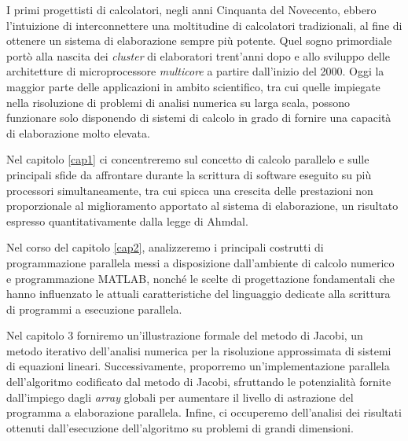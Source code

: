 I primi progettisti di calcolatori, negli anni Cinquanta del Novecento, ebbero l'intuizione di interconnettere
una moltitudine di calcolatori tradizionali, al fine di ottenere un sistema di elaborazione sempre più potente.\newline
Quel sogno primordiale port\`o alla nascita dei \textit{cluster} di elaboratori trent'anni dopo e allo sviluppo delle architetture di microprocessore
\textit{multicore} a partire dall'inizio del 2000.\newline
Oggi la maggior parte delle applicazioni in ambito scientifico, tra cui quelle impiegate nella risoluzione di problemi di analisi numerica
su larga scala, possono funzionare solo disponendo di sistemi di calcolo in grado di fornire una capacit\`a di elaborazione molto elevata.

Nel capitolo \ref{cap1} ci concentreremo sul concetto di calcolo parallelo e sulle principali sfide da affrontare
durante la scrittura di software eseguito su pi\`u processori simultaneamente, tra cui spicca una crescita delle prestazioni non proporzionale
al miglioramento apportato al sistema di elaborazione, un risultato espresso quantitativamente dalla legge di Ahmdal.

Nel corso del capitolo \ref{cap2}, analizzeremo i principali costrutti di programmazione parallela messi a disposizione dall’ambiente di calcolo numerico
e programmazione MATLAB\textsuperscript{\textregistered}, nonch\'e le scelte di progettazione fondamentali che hanno influenzato
le attuali caratteristiche del linguaggio dedicate alla scrittura di programmi a esecuzione parallela.

Nel capitolo 3 forniremo un'illustrazione formale del metodo di Jacobi, un metodo iterativo dell’analisi numerica per la risoluzione
approssimata di sistemi di equazioni lineari.\newline
Successivamente, proporremo un’implementazione parallela dell'algoritmo codificato dal metodo di Jacobi, sfruttando le potenzialità fornite
dall'impiego dagli \textit{array} globali per aumentare il livello di astrazione del programma a elaborazione parallela.\newline
Infine, ci occuperemo dell’analisi dei risultati ottenuti dall’esecuzione dell’algoritmo su problemi di grandi dimensioni.
